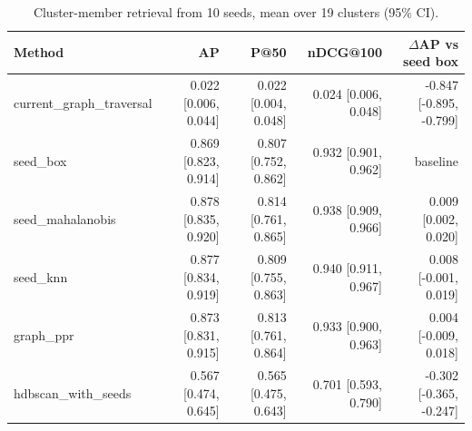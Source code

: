 \begin{table}[htbp]\centering\small
\caption{Cluster-member retrieval from 10 seeds, mean over 19 clusters (95\% CI).}\label{tab:retrieval}
\begin{tabular}{lrrrr}
\toprule
Method & AP & P@50 & nDCG@100 & $\Delta$AP vs seed box \\
\midrule
current\_graph\_traversal & 0.022 [0.006, 0.044] & 0.022 [0.004, 0.048] & 0.024 [0.006, 0.048] & -0.847 [-0.895, -0.799] \\
seed\_box & 0.869 [0.823, 0.914] & 0.807 [0.752, 0.862] & 0.932 [0.901, 0.962] & baseline \\
seed\_mahalanobis & 0.878 [0.835, 0.920] & 0.814 [0.761, 0.865] & 0.938 [0.909, 0.966] & 0.009 [0.002, 0.020] \\
seed\_knn & 0.877 [0.834, 0.919] & 0.809 [0.755, 0.863] & 0.940 [0.911, 0.967] & 0.008 [-0.001, 0.019] \\
graph\_ppr & 0.873 [0.831, 0.915] & 0.813 [0.761, 0.864] & 0.933 [0.900, 0.963] & 0.004 [-0.009, 0.018] \\
hdbscan\_with\_seeds & 0.567 [0.474, 0.645] & 0.565 [0.475, 0.643] & 0.701 [0.593, 0.790] & -0.302 [-0.365, -0.247] \\
\bottomrule
\end{tabular}
\end{table}
